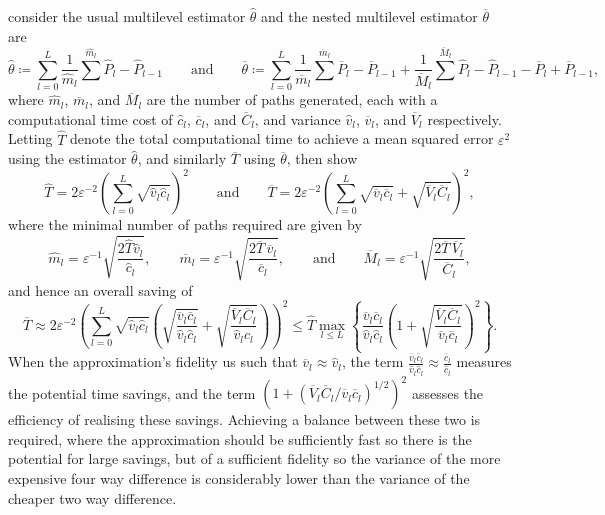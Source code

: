 \documentclass[manuscript,review]{acmart}
\begin{document}
\citet{giles2020approximating} consider the usual multilevel estimator $ \hat{\theta} $ and the nested multilevel estimator $ \overline{\theta} $ are
\begin{equation*}
\hat{\theta}  \coloneqq \sum_{l=0}^{L} \dfrac{1}{\widehat{m}_l} \sum^{\widehat{m}_l} \widehat{P}_l - \widehat{P}_{l-1}
\qquad \text{and} \qquad
\overline{\theta} \coloneqq \sum_{l=0}^L \dfrac{1}{\overline{m}_l} \sum^{\overline{m}_l} \overline{P}_l - \overline{P}_{l-1} + \dfrac{1}{\overline{M}_l} \sum^{\overline{M}_l} \widehat{P}_l - \widehat{P}_{l-1} - \overline{P}_l + \overline{P}_{l-1},
\end{equation*}
where $ \widehat{m}_l $, $ \overline{m}_l $, and $ \overline{M}_l $ are the number of paths generated, each with a computational time cost of $ \hat{c}_l $, $ \overline{c}_l $, and $ \overline{C}_l $, and variance $ \hat{v}_l $, $ \overline{v}_l $, and $ \overline{V}_l $ respectively. Letting $ \widehat{T} $ denote the total computational time to achieve a mean squared error $ \varepsilon^2 $ using the estimator $ \hat{\theta} $, and similarly $ \overline{T} $ using $ \overline{\theta} $, then \citet{giles2020approximating} show
\begin{equation*}
\widehat{T} = 2\varepsilon^{-2}\left(\sum_{l=0}^L \sqrt{\hat{v}_l \hat{c}_l}\right)^2 
\qquad \text{and} \qquad 
\overline{T} = 2\varepsilon^{-2} \left(\sum_{l=0}^L \sqrt{\overline{v}_l \overline{c}_l} + \sqrt{\overline{V}_l \overline{C}_l}\right)^2,
\end{equation*}
where the minimal number of paths required are given by
\begin{equation*}
\widehat{m}_l = \varepsilon^{-1} \sqrt{\dfrac{2\widehat{T}\hat{v}_l}{\hat{c}_l}},
\qquad 
\overline{m}_l  = \varepsilon^{-1} \sqrt{\dfrac{2\overline{T}\, \overline{v}_l}{\overline{c}_l}}, 
\qquad 
\text{and}
\qquad 
\overline{M}_l  = \varepsilon^{-1} \sqrt{\dfrac{2\overline{T}\, \overline{V}_l}{\overline{C}_l}},
\end{equation*}
and hence an overall saving of
\begin{equation*}
\overline{T} 
\approx 2\varepsilon^{-2} \left(\sum_{l=0}^L \sqrt{\hat{v}_l \hat{c}_l} \left( \sqrt{\dfrac{\overline{v}_l\overline{c}_l}{\hat{v}_l\hat{c}_l}} + \sqrt{\dfrac{\overline{V}_l \overline{C}_l}{\hat{v}_l \hat{c}_l}}\right)\right)^2 
\leq \widehat{T} \max_{l \leq L} \left\{ \dfrac{\overline{v}_l\overline{c}_l}{\hat{v}_l\hat{c}_l} \left(1 + \sqrt{\dfrac{\overline{V}_l \overline{C}_l}{\overline{v}_l \overline{c}_l}}\right)^2\right\}.
\end{equation*}
When the approximation's fidelity us such that $ \overline{v}_l \approx \hat{v}_l $, the term $ \tfrac{\overline{v}_l\overline{c}_l}{\hat{v}_l\hat{c}_l} \approx \tfrac{\overline{c}_l}{\hat{c}_l}$ measures the potential time savings, and the term $ (1 + (\overline{V}_l \overline{C}_l / \overline{v}_l \overline{c}_l)^{1/2})^2 $ assesses the efficiency of realising these savings. Achieving a balance between these two is required, where the approximation should be sufficiently fast so there is the potential for large savings, but of a sufficient fidelity so the variance of the more expensive four way difference is considerably lower than the variance of the cheaper two way difference.
\end{document}
